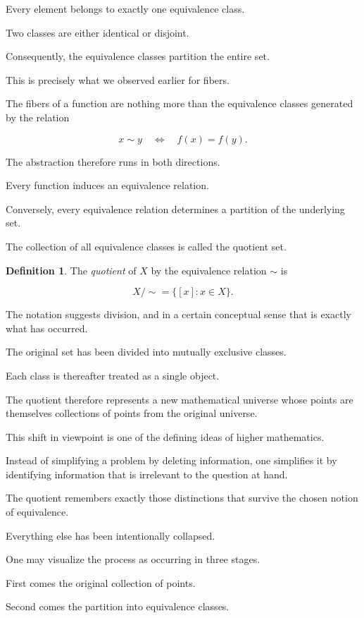 \documentclass[11pt]{book}
\numberwithin{equation}{chapter}
\theoremstyle{definition}
\newtheorem{definition}{Definition}[chapter]
\theoremstyle{plain}
\theoremstyle{remark}
\begin{document}
Every element belongs to exactly one equivalence class.

Two classes are either identical or disjoint.

Consequently, the equivalence classes partition the entire set.

This is precisely what we observed earlier for fibers.

The fibers of a function are nothing more than the equivalence classes generated by the relation

\[
x\sim y
\quad\Longleftrightarrow\quad
f(x)=f(y).
\]

The abstraction therefore runs in both directions.

Every function induces an equivalence relation.

Conversely, every equivalence relation determines a partition of the underlying set.

The collection of all equivalence classes is called the quotient set.

\begin{definition}
The \emph{quotient} of \(X\) by the equivalence relation \(\sim\) is

\[
X/\!\sim
=
\{[x]:x\in X\}.
\]
\end{definition}

The notation suggests division, and in a certain conceptual sense that is exactly what has occurred.

The original set has been divided into mutually exclusive classes.

Each class is thereafter treated as a single object.

The quotient therefore represents a new mathematical universe whose points are themselves collections of points from the original universe.

This shift in viewpoint is one of the defining ideas of higher mathematics.

Instead of simplifying a problem by deleting information, one simplifies it by identifying information that is irrelevant to the question at hand.

The quotient remembers exactly those distinctions that survive the chosen notion of equivalence.

Everything else has been intentionally collapsed.

One may visualize the process as occurring in three stages.

First comes the original collection of points.

Second comes the partition into equivalence classes.
\end{document}
